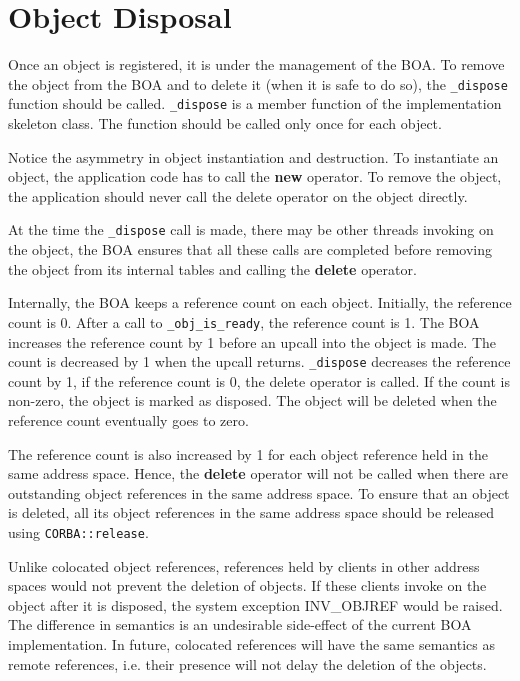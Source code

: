 \documentclass[11pt,twoside,onecolumn]{book}
\begin{document}
\section{Object Disposal}

Once an object is registered, it is under the
management of the BOA. To remove the object from the BOA and to delete it
(when it is safe to do so), the {\tt \_dispose} function should be called.
{\tt \_dispose} is a member function of the implementation skeleton class.
The function should be called only once for each object.

Notice the asymmetry in object instantiation and destruction. To instantiate
an object, the application code has to call the {\bf new}
operator. To remove the object, the application should never
call the delete operator on the object directly.

At the time the {\tt \_dispose} call is made, there may be other threads
invoking on the object, the BOA ensures that all these calls are completed
before removing the object from its internal tables and calling the
{\bf delete} operator.

Internally, the BOA keeps a reference count on each object. Initially, the
reference count is 0. After a call to {\tt \_obj\_is\_ready}, the reference
count is 1. The BOA increases the reference count by 1 before
an upcall into the object is made. The count is decreased by 1 when the
upcall returns.  {\tt \_dispose} decreases the reference count by 1, if
the reference count is 0, the delete operator is called. If the count is
non-zero, the object is marked as disposed. The object will be deleted when
the reference count eventually goes to zero.

The reference count is also increased by 1 for each object reference held
in the same address space. Hence, the {\bf delete} operator will not be
called when there are outstanding object references in the same address
space. To ensure that an object is deleted, all its object references in
the same address space should be released using {\tt CORBA::release}.

Unlike colocated object references, references held by clients in other
address spaces would not prevent the deletion of objects. If these clients
invoke on the object after it is disposed, the system exception INV\_OBJREF
would be raised. The difference in semantics is an undesirable side-effect
of the current BOA implementation. In future, colocated references will
have the same semantics as remote references, i.e. their presence will not
delay the deletion of the objects.
\end{document}
